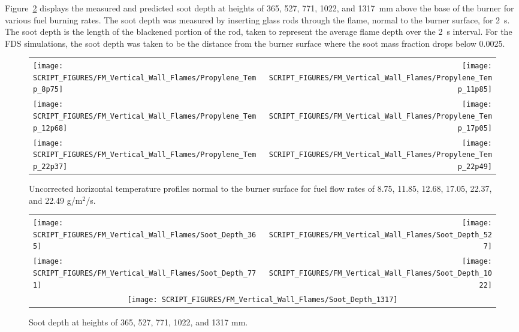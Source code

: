 Figure~\ref{FM_Vertical_Wall_Flame_soot_depth} displays the measured and predicted soot depth at heights of 365, 527, 771, 1022, and 1317~mm above the base of the burner for various fuel burning rates. The soot depth was measured by inserting glass rods through the flame, normal to the burner surface, for 2~s. The soot depth is the length of the blackened portion of the rod, taken to represent the average flame depth over the 2~s interval. For the FDS simulations, the soot depth was taken to be the distance from the burner surface where the soot mass fraction drops below 0.0025.

\begin{figure}[p]
\begin{tabular*}{\textwidth}{l@{\extracolsep{\fill}}r}
\texttt{[image: SCRIPT\_FIGURES/FM\_Vertical\_Wall\_Flames/Propylene\_Temp\_8p75]} &
\texttt{[image: SCRIPT\_FIGURES/FM\_Vertical\_Wall\_Flames/Propylene\_Temp\_11p85]} \\
\texttt{[image: SCRIPT\_FIGURES/FM\_Vertical\_Wall\_Flames/Propylene\_Temp\_12p68]} &
\texttt{[image: SCRIPT\_FIGURES/FM\_Vertical\_Wall\_Flames/Propylene\_Temp\_17p05]} \\
\texttt{[image: SCRIPT\_FIGURES/FM\_Vertical\_Wall\_Flames/Propylene\_Temp\_22p37]} &
\texttt{[image: SCRIPT\_FIGURES/FM\_Vertical\_Wall\_Flames/Propylene\_Temp\_22p49]}
\end{tabular*}
\caption[FM Vertical Wall Flame mean temperature profiles]
{Uncorrected horizontal temperature profiles normal to the burner surface for fuel flow rates of 8.75, 11.85, 12.68, 17.05, 22.37, and 22.49 g/m$^2$/s.}
\label{FM_Vertical_Wall_Flame_temperature}
\end{figure}

\begin{figure}[p]
\begin{tabular*}{\textwidth}{l@{\extracolsep{\fill}}r}
\texttt{[image: SCRIPT\_FIGURES/FM\_Vertical\_Wall\_Flames/Soot\_Depth\_365]} &
\texttt{[image: SCRIPT\_FIGURES/FM\_Vertical\_Wall\_Flames/Soot\_Depth\_527]} \\
\texttt{[image: SCRIPT\_FIGURES/FM\_Vertical\_Wall\_Flames/Soot\_Depth\_771]} &
\texttt{[image: SCRIPT\_FIGURES/FM\_Vertical\_Wall\_Flames/Soot\_Depth\_1022]} \\
\multicolumn{2}{c}{\texttt{[image: SCRIPT\_FIGURES/FM\_Vertical\_Wall\_Flames/Soot\_Depth\_1317]}}
\end{tabular*}
\caption[FM Vertical Wall Flame soot depth measurements]
{Soot depth at heights of 365, 527, 771, 1022, and 1317 mm.}
\label{FM_Vertical_Wall_Flame_soot_depth}
\end{figure}







